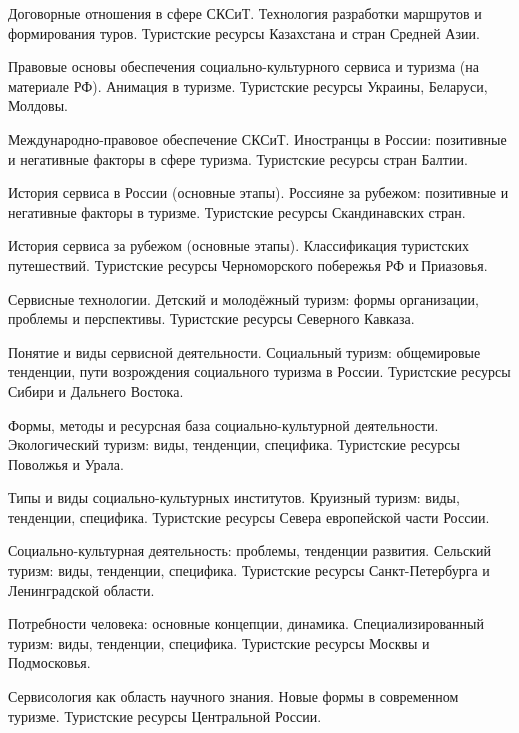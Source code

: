 \documentclass[
	11pt,
	a4paper,
	]
	{article}
\begin{document}
\bigskip

\noindent{} 
	{
		Договорные отношения в сфере СКСиТ.
	}{
		Технология разработки маршрутов и формирования туров.
	}{
		Туристские ресурсы Казахстана и стран Средней Азии.
	}

\bigskip

\noindent{} 
	{
		Правовые основы обеспечения социально-культурного сервиса и туризма (на материале РФ).
	}{
		Анимация в туризме.
	}{
		Туристские ресурсы Украины, Беларуси, Молдовы.
	}

\bigskip

\noindent{} 
	{
		Международно-правовое обеспечение СКСиТ.
	}{
		Иностранцы в России: позитивные и негативные факторы в сфере туризма.
	}{
		Туристские ресурсы стран Балтии.
	}

\bigskip

\noindent{} 
	{
		История сервиса в России (основные этапы).
	}{
		Россияне за рубежом: позитивные и негативные факторы в туризме.
	}{
		Туристские ресурсы Скандинавских стран.
	}

\bigskip

\noindent{} 
	{
		История сервиса за рубежом (основные этапы).
	}{
		Классификация туристских путешествий.
	}{
		Туристские ресурсы Черноморского побережья РФ и Приазовья.
	}

\bigskip

\noindent{} 
	{
		Сервисные технологии.
	}{
		Детский и молодёжный туризм: формы организации, проблемы и перспективы.
	}{
		Туристские ресурсы Северного Кавказа.
	}

\bigskip

\noindent{} 
	{
		Понятие и виды сервисной деятельности.
	}{
		Социальный туризм: общемировые тенденции, пути возрождения социального туризма в России.
	}{
		Туристские ресурсы Сибири и Дальнего Востока.
	}

\bigskip

\noindent{} 
	{
		Формы, методы и ресурсная база социально-культурной деятельности.
	}{
		Экологический туризм: виды, тенденции, специфика.
	}{
		Туристские ресурсы Поволжья и Урала.
	}

\bigskip

\noindent{} 
	{
		Типы и виды социально-культурных институтов.
	}{
		Круизный туризм: виды, тенденции, специфика.
	}{
		Туристские ресурсы Севера европейской части России.
	}

\bigskip

\noindent{} 
	{
		Социально-культурная деятельность: проблемы, тенденции развития.
	}{
		Сельский туризм: виды, тенденции, специфика.
	}{
		Туристские ресурсы Санкт-Петербурга и Ленинградской области.
	}

\bigskip

\noindent{} 
	{
		Потребности человека: основные концепции, динамика.
	}{
		Специализированный туризм: виды, тенденции, специфика.
	}{
		Туристские ресурсы Москвы и Подмосковья.
	}

\bigskip

\noindent{} 
	{
		Сервисология как область научного знания.
	}{
		Новые формы в современном туризме.
	}{
		Туристские ресурсы Центральной России.
	}

\bigskip
\end{document}
